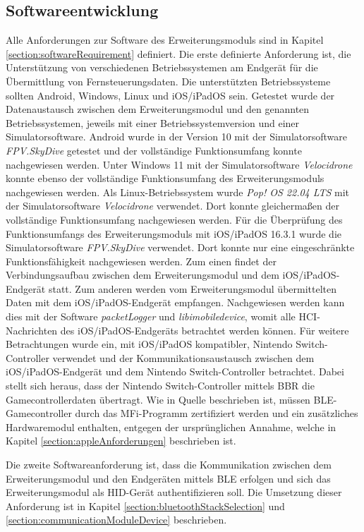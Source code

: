 \subsection{Softwareentwicklung}
Alle Anforderungen zur Software des Erweiterungsmoduls sind in Kapitel \ref{section:softwareRequirement} definiert. Die erste definierte Anforderung ist, die Unterstützung von verschiedenen Betriebssystemen am Endgerät für die Übermittlung von Fernsteuerungsdaten. Die unterstützten Betriebssysteme sollten Android, Windows, Linux und iOS/iPadOS sein. Getestet wurde der Datenaustausch zwischen dem Erweiterungsmodul und den genannten Betriebssystemen, jeweils mit einer Betriebssystemversion und einer Simulatorsoftware. Android wurde in der Version 10 mit der Simulatorsoftware \textit{FPV.SkyDive} getestet und der vollständige Funktionsumfang konnte nachgewiesen werden. Unter Windows 11 mit der Simulatorsoftware \textit{Velocidrone} konnte ebenso der vollständige Funktionsumfang des Erweiterungsmoduls nachgewiesen werden. Als Linux-Betriebssystem wurde \textit{Pop! OS 22.04 LTS} mit der Simulatorsoftware \textit{Velocidrone} verwendet. Dort konnte gleichermaßen der vollständige Funktionsumfang nachgewiesen werden. Für die Überprüfung des Funktionsumfangs des Erweiterungsmoduls mit iOS/iPadOS 16.3.1 wurde die Simulatorsoftware \textit{FPV.SkyDive} verwendet. Dort konnte nur eine eingeschränkte Funktionsfähigkeit nachgewiesen werden. Zum einen findet der Verbindungsaufbau zwischen dem Erweiterungsmodul und dem iOS/iPadOS-Endgerät statt. Zum anderen werden vom Erweiterungsmodul übermittelten Daten mit dem iOS/iPadOS-Endgerät empfangen. Nachgewiesen werden kann dies mit der Software \textit{packetLogger} und \textit{libimobiledevice}, womit alle \ac{HCI}-Nachrichten des iOS/iPadOS-Endgeräts betrachtet werden können. Für weitere Betrachtungen wurde ein, mit iOS/iPadOS kompatibler, Nintendo Switch-Controller verwendet und der Kommunikationsaustausch zwischen dem iOS/iPadOS-Endgerät und dem Nintendo Switch-Controller betrachtet. Dabei stellt sich heraus, dass der Nintendo Switch-Controller mittels \ac{BBR} die Gamecontrollerdaten übertragt. Wie in Quelle \cite{lemmingDevESP32Comment} beschrieben ist, müssen \ac{BLE}-Gamecontroller durch das \ac{MFi}-Programm zertifiziert werden und ein zusätzliches Hardwaremodul enthalten, entgegen der ursprünglichen Annahme, welche in Kapitel \ref{section:appleAnforderungen} beschrieben ist.

Die zweite Softwareanforderung ist, dass die Kommunikation zwischen dem Erweiterungsmodul und den Endgeräten mittels \ac{BLE} erfolgen und sich das Erweiterungsmodul als \ac{HID}-Gerät authentifizieren soll. Die Umsetzung dieser Anforderung ist in Kapitel \ref{section:bluetoothStackSelection} und \ref{section:communicationModuleDevice} beschrieben.

